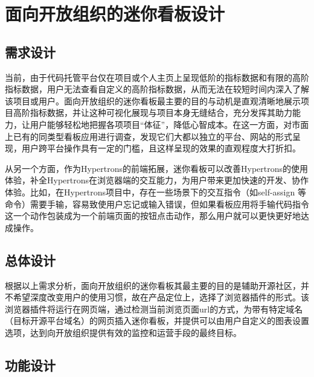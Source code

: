 \section{面向开放组织的迷你看板设计}
\subsection{需求设计}
\par 当前，由于代码托管平台仅在项目或个人主页上呈现低阶的指标数据和有限的高阶指标数据，用户无法查看自定义的高阶指标数据，从而无法在较短时间内深入了解该项目或用户。面向开放组织的迷你看板最主要的目的与动机是直观清晰地展示项目高阶指标数据，并让这种可视化展现与项目本身无缝结合，充分发挥其助力能力，让用户能够轻松地把握各项项目“体征”，降低心智成本。在这一方面，对市面上已有的同类型看板应用进行调查，发现它们大都以独立的平台、网站的形式呈现，用户跨平台操作具有一定的门槛，且这样呈现的效果的直观程度大打折扣。

\par 从另一个方面，作为Hypertrons的前端拓展，迷你看板可以改善Hypertrons的使用体验，补全Hypertrons在浏览器端的交互能力，为用户带来更加快速的开发、协作体验。比如，在Hypertrons项目中，存在一些场景下的交互指令（如self-assign 等命令）需要手输，容易致使用户忘记或输入错误，但如果看板应用将手输代码指令这一个动作包装成为一个前端页面的按钮点击动作，那么用户就可以更快更好地达成操作。

\subsection{总体设计}
\par 根据以上需求分析，面向开放组织的迷你看板其最主要的目的是辅助开源社区，并不希望深度改变用户的使用习惯，故在产品定位上，选择了浏览器插件的形式。该浏览器插件将运行在网页端，通过检测当前浏览页面url的方式，为带有特定域名（目标开源平台域名）的网页插入迷你看板，并提供可以由用户自定义的图表设置选项，达到向开放组织提供有效的监控和运营手段的最终目标。


\subsection{功能设计}
